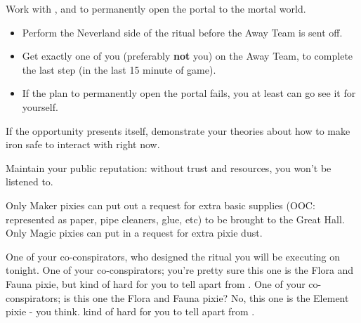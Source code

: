 \documentclass[char]{PP}
\begin{document}
\begin{itemz}
	\item Work with \cSLibrarian{}, \cFHeart{} and \cESweet{} to permanently open the portal to the mortal world.
	\begin{itemize}
		\item Perform the Neverland side of the ritual before the Away Team is sent off.
		\item Get exactly one of you (preferably \textbf{not} you) on the Away Team, to complete the last step (in the last 15 minute of game).
		\item If the plan to permanently open the portal fails, you at least can go see it for yourself.
	\end{itemize}
	\item If the opportunity presents itself, demonstrate your theories about how to make iron safe to interact with right now.
	\item Maintain your public reputation: without trust and resources, you won't be listened to.
	\item
\end{itemz}

\begin{itemz}[Notes]
	\item Only Maker pixies can put out a request for extra basic supplies (OOC: represented as paper, pipe cleaners, glue, etc) to be brought to the Great Hall. Only Magic pixies can put in a request for extra pixie dust.
\end{itemz}

\begin{contacts}
	\contact{\cSLibrarian{}} One of your co-conspirators, who designed the ritual you will be executing on tonight.
	\contact{\cFHeart{}} One of your co-conspirators; you’re pretty sure this one is the Flora and Fauna pixie, but \cFHeart{\theyare} kind of hard for you to tell apart from \cESweet{}.
	\contact{\cESweet{}} One of your co-conspirators; is this one the Flora and Fauna pixie? No, this one is the Element pixie - you think. \cESweet{\Theyare} kind of hard for you to tell apart from \cFHeart{}.
\end{contacts}
\end{document}

